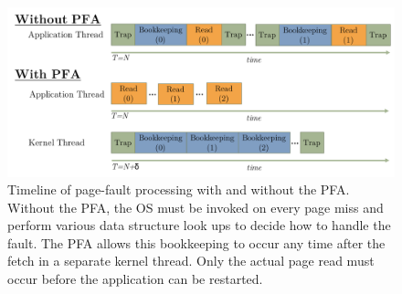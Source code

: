 \begin{figure}[h]
    \centering
    \includegraphics[width=\columnwidth]{figs/bookkeeping_timeline.pdf}
    \vspace{-5mm}
    \caption{Timeline of page-fault processing with and without the PFA. Without the PFA, the OS must be invoked on every page miss and perform various data structure look ups to decide how to handle the fault. The PFA allows this bookkeeping to occur any time after the fetch in a separate kernel thread. Only the actual page read must occur before the application can be restarted.}
    \label{fig:bookkeeping_timeline}
\end{figure}

\FloatBarrier
